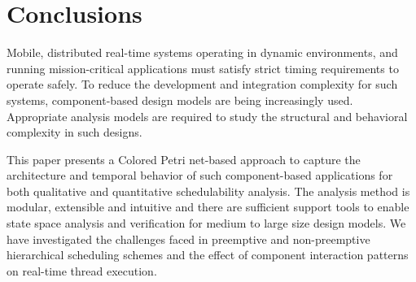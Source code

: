 \section{Conclusions}
\label{sec:Conclusions}

Mobile, distributed real-time systems operating in dynamic environments, and running mission-critical applications must satisfy strict timing requirements to operate safely. To reduce the development and integration complexity for such systems, component-based design models are being increasingly used. Appropriate analysis models are required to study the structural and behavioral complexity in such designs. 

This paper presents a Colored Petri net-based approach to capture the architecture and temporal behavior of such component-based applications for both qualitative and quantitative schedulability analysis. The analysis method is modular, extensible and intuitive and there are sufficient support tools to enable state space analysis and verification for medium to large size design models. We have  investigated the challenges faced in preemptive and non-preemptive hierarchical scheduling schemes and the effect of component interaction patterns on real-time thread execution. 



